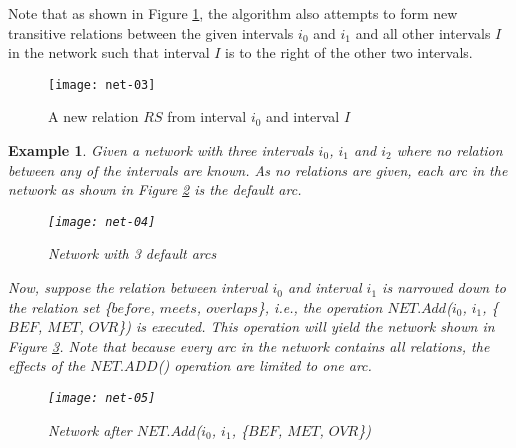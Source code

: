 \documentclass[11pt]{report}
\newtheorem{vexample}{Example}
\begin{document}
          Note that as shown in Figure \ref{fig-net-ex-03}, the algorithm also
          attempts to form new transitive relations between the given intervals
          $i_0$ and $i_1$ and all other intervals $I$ in the network such that
          interval $I$ is to the right of the other two intervals.

          \begin{figure}[[tbhp]
            \begin{center}
              \texttt{[image: net-03]}
              \caption{A new relation $RS$ from interval $i_0$ and interval $I$}
              \label{fig-net-ex-03}
            \end{center}
          \end{figure}

          \begin{vexample}
            Given a network with three intervals $i_0$, $i_1$ and $i_2$ where
            no relation between any of the intervals are known. As no relations
            are given, each arc in the network as shown in Figure
            \ref{fig-net-ex-04} is the default arc.

            \begin{figure}[[tbhp]
              \begin{center}
                \texttt{[image: net-04]}
                \caption{Network with 3 default arcs}
                \label{fig-net-ex-04}
              \end{center}
            \end{figure}

            Now, suppose the relation between interval $i_0$ and interval $i_1$
            is narrowed down to the relation set \{$before$, $meets$,
            $overlaps$\}, i.e., the operation $NET.Add$($i_0$, $i_1$, \{$BEF$,
            $MET$, $OVR$\}) is executed. This operation will yield the network
            shown in Figure \ref{fig-net-ex-05}. Note that because every arc
            in the network contains all relations, the effects of the
            $NET.ADD$() operation are limited to one arc.

            \begin{figure}[[tbhp]
              \begin{center}
                \texttt{[image: net-05]}
                \caption{Network after $NET.Add$($i_0$, $i_1$, \{$BEF$, $MET$, $OVR$\})}
                \label{fig-net-ex-05}
              \end{center}
            \end{figure}


\end{vexample}
\end{document}
